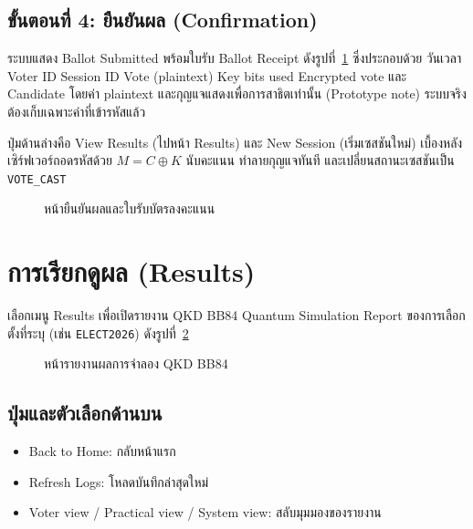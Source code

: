 \subsection{ขั้นตอนที่ 4: ยืนยันผล (Confirmation)}

ระบบแสดง Ballot Submitted พร้อมใบรับ Ballot Receipt ดังรูปที่~\ref{fig:manual-receipt}
ซึ่งประกอบด้วย วันเวลา Voter ID Session ID Vote (plaintext) Key bits used Encrypted vote
และ Candidate โดยค่า plaintext และกุญแจแสดงเพื่อการสาธิตเท่านั้น (Prototype note)
ระบบจริงต้องเก็บเฉพาะค่าที่เข้ารหัสแล้ว

ปุ่มด้านล่างคือ View Results (ไปหน้า Results) และ New Session (เริ่มเซสชันใหม่)
เบื้องหลังเซิร์ฟเวอร์ถอดรหัสด้วย $M = C \oplus K$ นับคะแนน ทำลายกุญแจทันที
และเปลี่ยนสถานะเซสชันเป็น \texttt{VOTE\_CAST}

\begin{figure}[htbp]
\centering
\caption{หน้ายืนยันผลและใบรับบัตรลงคะแนน}
\label{fig:manual-receipt}
\end{figure}

\section{การเรียกดูผล (Results)}

เลือกเมนู Results เพื่อเปิดรายงาน QKD BB84 Quantum Simulation Report ของการเลือกตั้งที่ระบุ
(เช่น \texttt{ELECT2026}) ดังรูปที่~\ref{fig:manual-results}

\begin{figure}[htbp]
\centering
\caption{หน้ารายงานผลการจำลอง QKD BB84}
\label{fig:manual-results}
\end{figure}

\subsection{ปุ่มและตัวเลือกด้านบน}
\begin{itemize}
  \item Back to Home: กลับหน้าแรก
  \item Refresh Logs: โหลดบันทึกล่าสุดใหม่
  \item Voter view / Practical view / System view: สลับมุมมองของรายงาน
\end{itemize}

